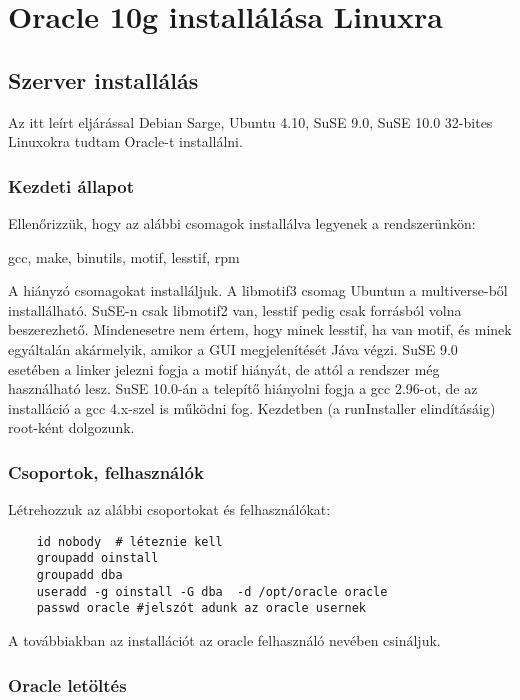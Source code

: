 
\section{Oracle 10g installálása Linuxra}

\subsection{Szerver installálás}

Az itt leírt eljárással 
Debian Sarge, 
Ubuntu 4.10, 
SuSE 9.0,
SuSE 10.0
32-bites Linuxokra tudtam Oracle-t installálni.

\subsubsection*{Kezdeti állapot}

Ellenőrizzük, hogy az alábbi csomagok installálva
legyenek a rendszerünkön:

gcc, make, binutils, motif, lesstif, rpm

A hiányzó csomagokat installáljuk.
A libmotif3 csomag Ubuntun a multiverse-ből installálható.
SuSE-n csak libmotif2 van, lesstif pedig csak forrásból volna beszerezhető.
Mindenesetre nem értem, hogy minek lesstif, ha van motif, és minek
egyáltalán akármelyik, amikor a GUI megjelenítését Jáva végzi.
SuSE 9.0 esetében a linker jelezni fogja a motif hiányát, 
de attól a rendszer még használható lesz.
SuSE 10.0-án a telepítő hiányolni fogja a gcc 2.96-ot,
de az installáció a gcc 4.x-szel is működni fog.
Kezdetben (a runInstaller elindításáig) root-ként dolgozunk.


\subsubsection*{Csoportok, felhasználók}

Létrehozzuk az alábbi csoportokat és felhasználókat:

\begin{verbatim}
    id nobody  # léteznie kell
    groupadd oinstall
    groupadd dba
    useradd -g oinstall -G dba  -d /opt/oracle oracle
    passwd oracle #jelszót adunk az oracle usernek
\end{verbatim}

A továbbiakban az installációt az oracle felhasználó
nevében csináljuk.


\subsubsection*{Oracle letöltés}

